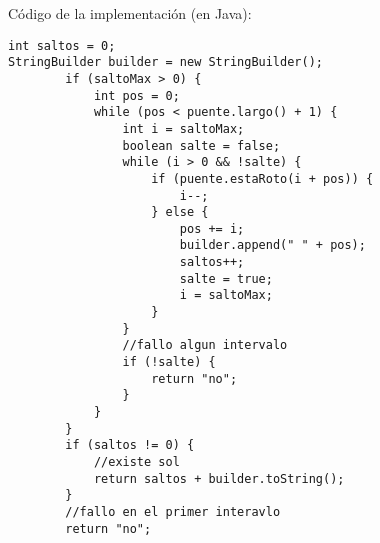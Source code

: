 Código de la implementaci\'on (en Java):
\begin{lstlisting}[frame=single]
int saltos = 0;
StringBuilder builder = new StringBuilder();
		if (saltoMax > 0) {
			int pos = 0;
			while (pos < puente.largo() + 1) {
				int i = saltoMax;
				boolean salte = false;
				while (i > 0 && !salte) {
					if (puente.estaRoto(i + pos)) {
						i--;
					} else {
						pos += i;
						builder.append(" " + pos);
						saltos++;
						salte = true;
						i = saltoMax;
					}
				}
				//fallo algun intervalo
				if (!salte) {
					return "no";
				}
			}
		}
		if (saltos != 0) {
			//existe sol		
			return saltos + builder.toString();
		}
		//fallo en el primer interavlo
		return "no";
\end{lstlisting}

